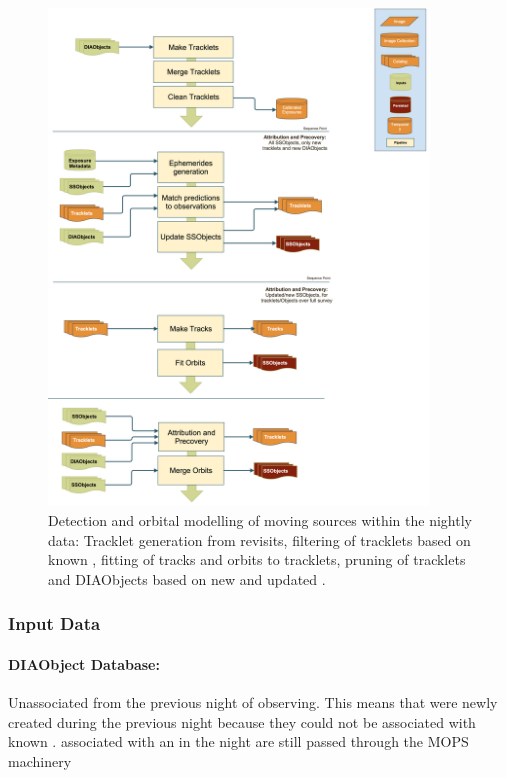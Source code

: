 \begin{figure}[th]
\begin{center}
\includegraphics[width=0.9\textwidth]{figures/MOPS.png}
\caption{\label{fig:apMOPS} Detection and orbital modelling of moving sources within the nightly data: Tracklet generation from revisits, filtering of tracklets based on  known \SSObjects, fitting of tracks and orbits to tracklets, pruning of tracklets and DIAObjects based on new and updated \SSObjects.}
\end{center}
\end{figure} 

\subsubsection{Input Data}

\paragraph*{DIAObject Database: } Unassociated \DIASources from the previous night of observing.  This means \DIAObjects that were newly created during the previous night because they could not be associated with known \DIAObjects.  \DIASources associated with an \SSObject in the night are still passed through the MOPS machinery

